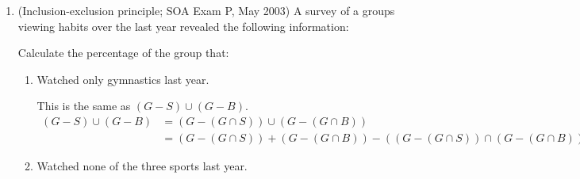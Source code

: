 \documentclass[11pt]{article}
\begin{document}
\begin{enumerate}
		\item (Inclusion-exclusion principle; SOA Exam P, May 2003) A survey of a groups viewing habits over the last year revealed the following information:
			Calculate the percentage of the group that:
				\begin{enumerate}
					\item Watched only gymnastics last year.
						\begin{mdframed}
							This is the same as $ (G - S) \cup (G - B) $.
							\begin{align*}
								(G - S) \cup (G - B) &= (G - (G \cap S)) \cup (G - (G \cap B))\\
								&= (G - (G \cap S)) + (G - (G \cap B)) - ((G - (G \cap S)) \cap (G - (G \cap B)))
							\end{align*}
						\end{mdframed}
					\item Watched none of the three sports last year.
				\end{enumerate}
	\end{enumerate}
\end{document}

